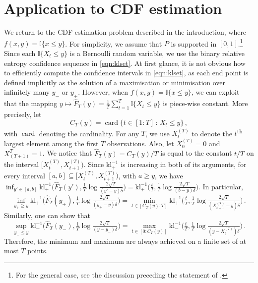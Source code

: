 \documentclass[3p, authoryear, 10pt]{elsarticle}%
\newcommand{\kl}{\mathrm{kl}}
\DeclareMathOperator{\card}{card}
\begin{document}
\section{Application to CDF estimation}
\label{sec:cdf}
We return to the CDF estimation problem described in the introduction, where $f(x,y) = \mathbb{I}\{x \leq y\}$. For simplicity, we assume that $P$ is supported in $[0,1]$.\footnote{For the general case, see the discussion preceding the statement of .} Since each $\mathbb{I}\{X_t \leq y\}$ is a Bernoulli random variable, we use the binary relative entropy confidence sequence in \eqref{eqn:klset}. At first glance, it is not obvious how to efficiently compute the confidence intervals in \eqref{eqn:klset}, as each end point is defined implicitly as the solution of a maximisation or minimisation over infinitely many $y_-$ or $y_+$. However, when $f(x,y) = \mathbb{I}\{x \leq y\}$, we can exploit that the mapping $y \mapsto \hat F_T(y) = \frac{1}{T}\sum_{t=1}^{T}\mathbb{I}\{X_t \leq y\}$ is piece-wise constant. More precisely, let
$$C_T(y) = \card\big\{t\in[1:T]\,:\,X_t\leq y\big\}\,,$$
with $\card$ denoting the cardinality. For any $T$, we use $X^{(T)}_{t}$ to denote the $t$\textsuperscript{th} largest element among the first $T$ observations. Also, let $X^{(T)}_{0} = 0$ and $X^T_{(T+1)}=1$. We notice that $\hat F_T(y) = C_T(y)/T$ is equal to the constant $t/T$ on the interval $[X^{(T)}_{t}, X^{(T)}_{t+1})$. Since $\kl^{-1}_+$ is increasing in both of its arguments, for every interval $[a,b]\subseteq [X^{(T)}_{t}, X^{(T)}_{t+1})$, with $a\geq y$, we have $\inf_{y'\in[a, b]}\kl^{-1}_+\big(\hat F_T(y'),\tfrac{1}{T}\log\tfrac{2\sqrt T}{(y'-y)\delta}\big) = \kl^{-1}_+\big(\tfrac{t}{T},\tfrac{1}{T}\log\tfrac{2\sqrt T}{(b-y)\delta}\big)$. In particular,
$$\inf_{y_+\geq y}\kl^{-1}_+\Big(\hat F_T(y_+),\tfrac{1}{T}\log\tfrac{2\sqrt T}{(y_+-y)\delta}\Big) = \min_{t\in[C_T(y):T]}\kl^{-1}_+\Big(\tfrac{t}{T},\tfrac{1}{T}\log\tfrac{2\sqrt T}{(X^{(T)}_{t+1}-y)\delta}\Big)\,.$$
Similarly, one can show that $$\sup_{y_-\leq y}\kl^{-1}_-\Big(\hat F_T(y_-),\tfrac{1}{T}\log\tfrac{2\sqrt T}{(y-y_-)\delta}\Big) = \max_{t\in[ 0:C_T(y)]}\kl^{-1}_-\Big(\tfrac{t}{T},\tfrac{1}{T}\log\tfrac{2\sqrt T}{(y-X^{(T)}_{t})\delta}\Big)\,.$$
Therefore, the minimum and maximum are always achieved on a finite set of at most $T$ points.
\end{document}
